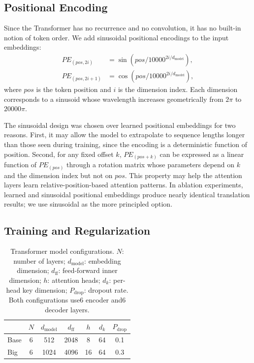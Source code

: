 ﻿\documentclass{article}
\begin{document}
\subsection{Positional Encoding}

Since the Transformer has no recurrence and no convolution, it has no built-in notion of token order. We add sinusoidal positional encodings to the input embeddings:
\begin{equation}
\begin{aligned}
PE_{(pos,2i)} &= \sin(pos /10000^{2i/d_{\text{model}}}), \\
PE_{(pos,2i+1)} &= \cos(pos /10000^{2i/d_{\text{model}}}),
\end{aligned}
\label{eq:pe}
\end{equation}
where $pos$ is the token position and $i$ is the dimension index. Each dimension corresponds to a sinusoid whose wavelength increases geometrically from $2\pi$ to $20000\pi$.

The sinusoidal design was chosen over learned positional embeddings for two reasons. First, it may allow the model to extrapolate to sequence lengths longer than those seen during training, since the encoding is a deterministic function of position. Second, for any fixed offset $k$, $PE_{(pos+k)}$ can be expressed as a linear function of $PE_{(pos)}$ through a rotation matrix whose parameters depend on $k$ and the dimension index but not on $pos$. This property may help the attention layers learn relative-position-based attention patterns. In ablation experiments, learned and sinusoidal positional embeddings produce nearly identical translation results; we use sinusoidal as the more principled option.

\subsection{Training and Regularization}

\begin{table}[t]
 \centering
 \caption{Transformer model configurations. $N$: number of layers; $d_{\text{model}}$: embedding dimension; $d_{\text{ff}}$: feed-forward inner dimension; $h$: attention heads; $d_k$: per-head key dimension; $P_{\text{drop}}$: dropout rate. Both configurations use6 encoder and6 decoder layers.}
 \label{tab:config}
 \begin{tabular}{l c c c c c c}
 \toprule
 & $N$ & $d_{\text{model}}$ & $d_{\text{ff}}$ & $h$ & $d_k$ & $P_{\text{drop}}$ \\
 \midrule
 Base &6 &512 &2048 &8 &64 &0.1 \\
 Big &6 &1024 &4096 &16 &64 &0.3 \\
 \bottomrule
 \end{tabular}
\end{table}
\end{document}
